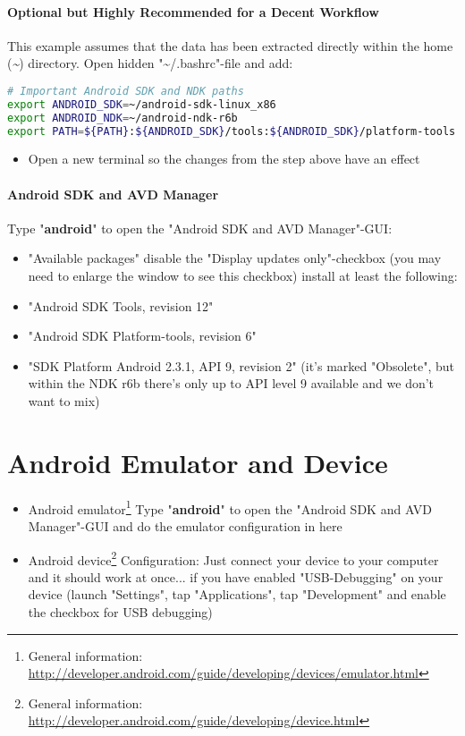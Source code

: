 \paragraph{Optional but Highly Recommended for a Decent Workflow}
This example assumes that the data has been extracted directly within the home (\emph{\textasciitilde}) directory. Open hidden "\textasciitilde /.bashrc"-file and add:
\begin{lstlisting}[language=sh]
# Important Android SDK and NDK paths
export ANDROID_SDK=~/android-sdk-linux_x86
export ANDROID_NDK=~/android-ndk-r6b
export PATH=${PATH}:${ANDROID_SDK}/tools:${ANDROID_SDK}/platform-tools:~/${ANDROID_NDK}
\end{lstlisting}
\begin{itemize}
\item{Open a new terminal so the changes from the step above have an effect}
\end{itemize}


\paragraph{Android \ac{SDK} and AVD Manager}
Type "\textbf{android}" to open the "Android SDK and AVD Manager"-\ac{GUI}:
\begin{itemize}
\item{"Available packages" \textrightarrow{} disable the "Display updates only"-checkbox (you may need to enlarge the window to see this checkbox) \textrightarrow{} install at least the following:}
\item{"Android SDK Tools, revision 12"}
\item{"Android SDK Platform-tools, revision 6"}
\item{"SDK Platform Android 2.3.1, \ac{API} 9, revision 2" (it's marked "Obsolete", but within the \ac{NDK} r6b there's only up to \ac{API} level 9 available and we don't want to mix)}
\end{itemize}




\section{Android Emulator and Device}
\begin{itemize}
\item{Android emulator\footnote{General information: \url{http://developer.android.com/guide/developing/devices/emulator.html}} \textrightarrow{} Type "\textbf{android}" to open the "Android SDK and AVD Manager"-\ac{GUI} and do the emulator configuration in here}
\item{Android device\footnote{General information: \url{http://developer.android.com/guide/developing/device.html}} \textrightarrow{} Configuration: Just connect your device to your computer and it should work at once... if you have enabled "USB-Debugging" on your device (launch "Settings", tap "Applications", tap "Development" and enable the checkbox for USB debugging)}
\end{itemize}


